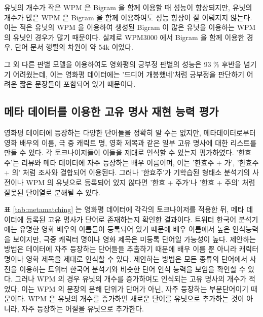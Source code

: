 \documentclass[oneside, ko,phd]{snuthesis_utf8_kor}
\begin{document}
유닛의 개수가 작은 WPM 은 Bigram 을 함께 이용할 때 성능이 향상되지만, 유닛의 개수가 많은 WPM 은 Bigram 을 함께 이용하여도 성능 향상이 잘 이뤄지지 않는다.
이는 적은 유닛의 WPM 을 이용하여 생성된 Bigram 이 많은 유닛을 이용하는 WPM 의 유닛인 경우가 많기 때문이다.
실제로 WPM3000 에서 Bigram 을 함께 이용한 경우, 단어 문서 행렬의 차원이 약 54k 이었다.

그 외 다른 판별 모델을 이용하여도 영화평의 긍부정 판별의 성능은 93 \% 후반을 넘기기 어려웠는데, 이는 영화평 데이터에는 '드디어 개봉했네'처럼 긍부정을 판단하기 어려운 짧은 문장들이 포함되어 있기 때문이다.


\subsection{메타 데이터를 이용한 고유 명사 재현 능력 평가}
영화평 데이터에 등장하는 다양한 단어들을 정확히 알 수는 없지만, 메타데이터로부터 영화 배우의 이름, 극 중 캐릭트 명, 영화 제목과 같은 일부 고유 명사에 대한 리스트를 만들 수 있다.
각 토크나이저들이 이들을 제대로 인식할 수 있는지 평가하였다.
'한효주'는 리뷰와 메타 데이터에 자주 등장하는 배우 이름이며, 이는 '한효주 + 가', '한효주 + 의' 처럼 조사와 결합되어 이용된다.
그러나 '한효주'가 기학습된 형태소 분석기의 사전이나 WPM 의 유닛으로 등록되어 있지 않다면 '한효 + 주가'나 '한효 + 주의' 처럼 잘못된 단어열로 분해될 수 있다.

표 \ref{tab:metamatching} 는 영화평 데이터에 각각의 토크나이저를 적용한 뒤, 메타 데이터에 등록된 고유 명사가 단어로 존재하는지 확인한 결과이다.
트위터 한국어 분석기에는 유명한 영화 배우의 이름들이 등록되어 있기 때문에 배우 이름에서 높은 인식능력을 보이지만, 극중 캐릭터 명이나 영화 제목은 미등록 단어일 가능성이 높다.
제안하는 방법은 데이터에 자주 등장하는 단어들을 추출하기 때문에 배우 이름 뿐 아니라 캐릭터 명이나 영화 제목을 제대로 인식할 수 있다.
제안하는 방법은 모든 종류의 단어에서 사전을 이용하는 트위터 한국어 분석기와 비슷한 단어 인식 능력을 보임을 확인할 수 있다.
그러나 WPM 의 경우 유닛의 개수를 증가하여도 인식되는 고유 명사의 개수가 적었다.
이는 WPM 의 문장의 분해 단위가 단어가 아닌, 자주 등장하는 부분단어이기 때문이다.
WPM 은 유닛의 개수를 증가하면 새로운 단어를 유닛으로 추가하는 것이 아니라, 자주 등장하는 어절을 유닛으로 추가한다.
\end{document}
